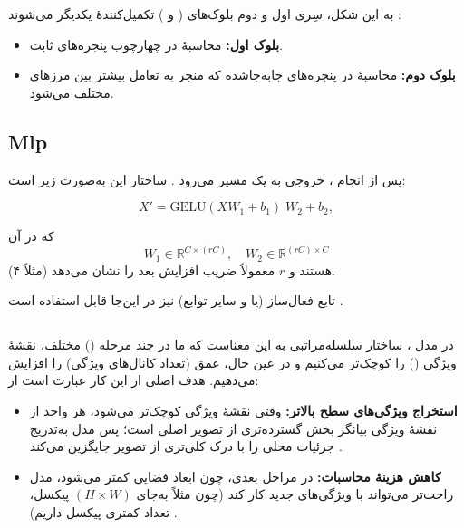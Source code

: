 به این شکل، سِری اول و دوم بلوک‌های \textbf{} (\textbf{} و \textbf{})
تکمیل‌کنندهٔ یکدیگر می‌شوند \cite{liu2021swintransformer}:
\begin{itemize}
	\item \textbf{بلوک اول:} محاسبهٔ  در چهارچوب پنجره‌های ثابت.
	\item \textbf{بلوک دوم:} محاسبهٔ  در پنجره‌های جابه‌جاشده که منجر به تعامل بیشتر بین مرزهای مختلف می‌شود.
\end{itemize}


\subsection{Mlp}
پس از انجام \textit{}، 
خروجی به یک مسیر \textbf{} می‌رود \cite{liu2021swintransformer}. ساختار این  به‌صورت زیر است:

\begin{equation}
	X' = \mathrm{GELU}(X W_1 + b_1) \; W_2 + b_2,
	\label{eq:gelu_transform}
\end{equation}

که در آن
\[
W_1 \in \mathbb{R}^{C \times (rC)}, 
\quad
W_2 \in \mathbb{R}^{(rC) \times C}
\]
هستند و \(\displaystyle r\) معمولاً ضریب افزایش بعد را نشان می‌دهد (مثلاً ۴). 

تابع فعال‌ساز  (یا  و سایر توابع) نیز در این‌جا قابل استفاده است \cite{hendrycks2016gelu}.

\subsection{}
در مدل ، ساختار سلسله‌مراتبی به این معناست که ما در چند مرحله () مختلف، نقشهٔ ویژگی () را کوچک‌تر می‌کنیم و در عین حال، عمق (تعداد کانال‌های ویژگی) را افزایش می‌دهیم. هدف اصلی از این کار عبارت است از:

\begin{itemize}
	\item \textbf{استخراج ویژگی‌های سطح بالاتر:}
	وقتی نقشهٔ ویژگی کوچک‌تر می‌شود، هر واحد از نقشهٔ ویژگی بیانگر بخش گسترده‌تری از تصویر اصلی است؛ 
	پس مدل به‌تدریج جزئیات محلی را با درک کلی‌تری از تصویر جایگزین می‌کند \cite{he2016deep}.
	
	\item \textbf{کاهش هزینهٔ محاسبات:}
	در مراحل بعدی، چون ابعاد فضایی کمتر می‌شود، مدل راحت‌تر می‌تواند با ویژگی‌های جدید کار کند 
	(چون مثلاً به‌جای \((H \times W)\) پیکسل، تعداد کمتری پیکسل داریم) \cite{liu2021swintransformer}.
\end{itemize}

